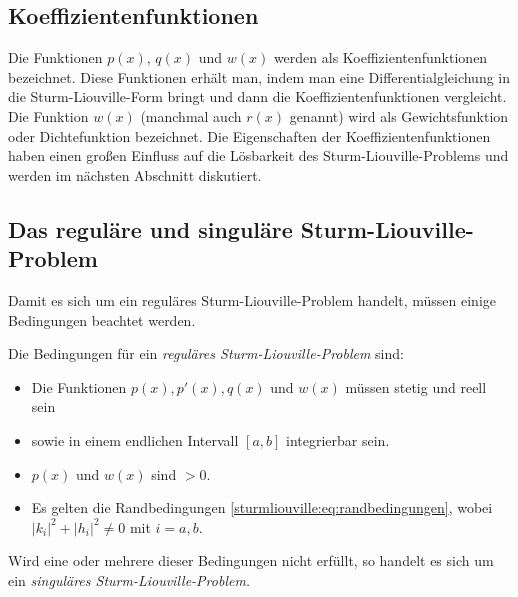 \subsection{Koeffizientenfunktionen
\label{sturmliouville:sub:koeffizientenfunktionen}}
Die Funktionen $p(x)$, $q(x)$ und $w(x)$ werden als Koeffizientenfunktionen 
bezeichnet.
Diese Funktionen erhält man, indem man eine Differentialgleichung in die
Sturm-Liouville-Form bringt und dann die Koeffizientenfunktionen vergleicht.
Die Funktion $w(x)$ (manchmal auch $r(x)$ genannt) wird als Gewichtsfunktion
oder Dichtefunktion bezeichnet.
Die Eigenschaften der Koeffizientenfunktionen haben
einen großen Einfluss auf die Lösbarkeit des Sturm-Liouville-Problems und werden
im nächsten Abschnitt diskutiert.

%
%

\subsection{Das reguläre und singuläre Sturm-Liouville-Problem
\label{sturmliouville:sub:reguläre_sturm_liouville_problem}}
Damit es sich um ein reguläres Sturm-Liouville-Problem
handelt, müssen einige Bedingungen beachtet werden.
\begin{definition}
	\label{sturmliouville:def:reguläres_sturm-liouville-problem}
	Die Bedingungen für ein {\em reguläres Sturm-Liouville-Problem} sind:
%
%
	\begin{itemize}
		\item Die Funktionen $p(x), p'(x), q(x)$ und $w(x)$ müssen
		stetig und reell sein
		\item sowie in einem endlichen Intervall $[a,b]$ integrierbar
		sein.
		\item $p(x)$ und $w(x)$ sind $>0$.
		\item Es gelten die Randbedingungen 
		\eqref{sturmliouville:eq:randbedingungen}, wobei
		$|k_i|^2 + |h_i|^2\ne 0$ mit $i=a,b$.
	\end{itemize}
Wird eine oder mehrere dieser Bedingungen nicht erfüllt, so handelt es sich um
ein {\em singuläres Sturm-Liouville-Problem.}
\end{definition}

